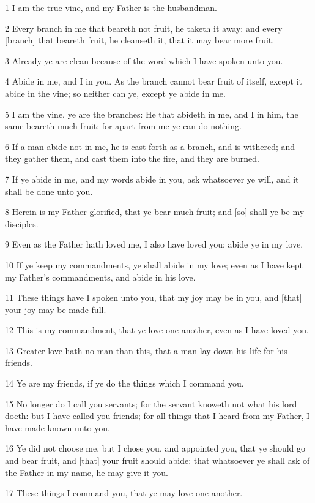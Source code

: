 \par 1 I am the true vine, and my Father is the husbandman.
\par 2 Every branch in me that beareth not fruit, he taketh it away: and every [branch] that beareth fruit, he cleanseth it, that it may bear more fruit.
\par 3 Already ye are clean because of the word which I have spoken unto you.
\par 4 Abide in me, and I in you. As the branch cannot bear fruit of itself, except it abide in the vine; so neither can ye, except ye abide in me.
\par 5 I am the vine, ye are the branches: He that abideth in me, and I in him, the same beareth much fruit: for apart from me ye can do nothing.
\par 6 If a man abide not in me, he is cast forth as a branch, and is withered; and they gather them, and cast them into the fire, and they are burned.
\par 7 If ye abide in me, and my words abide in you, ask whatsoever ye will, and it shall be done unto you.
\par 8 Herein is my Father glorified, that ye bear much fruit; and [so] shall ye be my disciples.
\par 9 Even as the Father hath loved me, I also have loved you: abide ye in my love.
\par 10 If ye keep my commandments, ye shall abide in my love; even as I have kept my Father's commandments, and abide in his love.
\par 11 These things have I spoken unto you, that my joy may be in you, and [that] your joy may be made full.
\par 12 This is my commandment, that ye love one another, even as I have loved you.
\par 13 Greater love hath no man than this, that a man lay down his life for his friends.
\par 14 Ye are my friends, if ye do the things which I command you.
\par 15 No longer do I call you servants; for the servant knoweth not what his lord doeth: but I have called you friends; for all things that I heard from my Father, I have made known unto you.
\par 16 Ye did not choose me, but I chose you, and appointed you, that ye should go and bear fruit, and [that] your fruit should abide: that whatsoever ye shall ask of the Father in my name, he may give it you.
\par 17 These things I command you, that ye may love one another.
